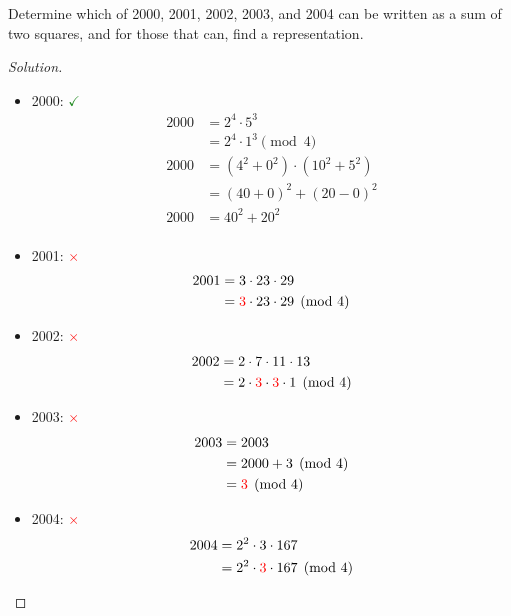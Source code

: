 \documentclass[11pt]{article}
\newenvironment{problem}[2][Problem]{\begin{trivlist}
\item[\hskip \labelsep {\bfseries #1}\hskip \labelsep {\bfseries #2.}]}{\end{trivlist}}
\newenvironment{solution}
  {\renewcommand\qedsymbol{$~$}\begin{proof}[Solution]$ $\par\nobreak\ignorespaces}
  {\end{proof}}
\begin{document}
\begin{problem}{2}
Determine which of 2000, 2001, 2002, 2003, and 2004 can be written as a sum of two squares, and for those that can, find a representation.
\end{problem}

\begin{solution}
  \begin{itemize}
    \item 2000: \textcolor{ForestGreen}{$\checkmark$}
          \begin{align*}
            2000 & = 2^4 \cdot 5^3                \\
                 & = 2^4 \cdot 1^3 \pmod{4}       \\
            2000 & = (4^2 + 0^2)\cdot(10^2 + 5^2) \\
                 & = (40+0)^2 + (20-0)^2          \\
            2000 & = 40^2 + 20^2                  \\
          \end{align*}
    \item 2001: \textcolor{red}{$\times$}
          \begin{align*}
            2001 & = 3 \cdot 23 \cdot 29                          \\
                 & = \textcolor{red}{3}\cdot 23 \cdot 29 \pmod{4} \\
          \end{align*}
    \item 2002: \textcolor{red}{$\times$}
          \begin{align*}
            2002 & = 2 \cdot 7 \cdot 11 \cdot 13                                          \\
                 & = 2 \cdot \textcolor{red}{3} \cdot \textcolor{red}{3} \cdot 1 \pmod{4} \\
          \end{align*}
    \item 2003: \textcolor{red}{$\times$}
          \begin{align*}
            2003 & = 2003                        \\
                 & = 2000 + 3 \pmod{4}           \\
                 & = \textcolor{red}{3} \pmod{4} \\
          \end{align*}
    \item 2004: \textcolor{red}{$\times$}
          \begin{align*}
            2004 & = 2^2 \cdot 3 \cdot 167                          \\
                 & = 2^2 \cdot \textcolor{red}{3}\cdot 167 \pmod{4} \\
          \end{align*}
  \end{itemize}
\end{solution}
\end{document}
